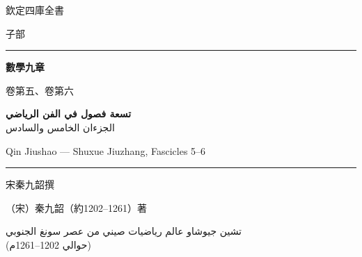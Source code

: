 \documentclass[11pt,a4paper]{article}
\begin{document}
\begin{titlepage}
\begin{center}
\vspace*{1.5cm}

{\fontsize{12}{16}\selectfont 欽定四庫全書}

\vspace{0.8cm}

{\fontsize{10}{14}\selectfont 子部}

\vspace{1.5cm}

\rule{0.85\textwidth}{1.5pt}

\vspace{0.8cm}

{\fontsize{26}{34}\selectfont\bfseries\color{titlecolor} 數學九章}

\vspace{0.4cm}

{\fontsize{14}{20}\selectfont\color{notecolor} 卷第五、卷第六}

\vspace{0.6cm}

{\fontsize{18}{24}\selectfont\arabicfont\beginR\color{titlecolor}
\textbf{تسعة فصول في الفن الرياضي}\\[0.3cm]
{\large الجزءان الخامس والسادس}\endR}

\vspace{0.4cm}

{\fontsize{12}{16}\selectfont\color{notecolor} Qin Jiushao --- Shuxue Jiuzhang, Fascicles 5--6}

\vspace{0.8cm}

\rule{0.85\textwidth}{1.5pt}

\vspace{1.5cm}

{\fontsize{12}{16}\selectfont 宋\quad 秦九韶\quad 撰}

\vspace{0.3cm}

{\fontsize{10}{14}\selectfont\color{notecolor} （宋）秦九韶（約1202--1261）著}

\vspace{0.8cm}

{\fontsize{11}{15}\selectfont\arabicfont\beginR\color{notecolor}
تشين جيوشاو \textbullet{} عالم رياضيات صيني من عصر سونغ الجنوبي\\
(حوالي 1202--1261م)
\endR}


\end{center}
\end{titlepage}
\end{document}
